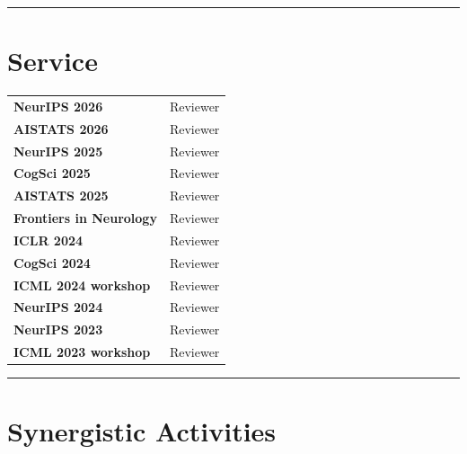 \documentclass[10pt,letterpaper]{article}
\begin{document}
\medskip\hrule\medskip

\section{Service}
\vspace{1mm}
\begin{tabular}{@{}l l@{}}
\textbf{NeurIPS 2026} & Reviewer\\
\textbf{AISTATS 2026} & Reviewer\\
\textbf{NeurIPS 2025} & Reviewer\\
\textbf{CogSci 2025} & Reviewer\\
\textbf{AISTATS 2025} & Reviewer\\
\textbf{Frontiers in Neurology} & Reviewer\\
\textbf{ICLR 2024} & Reviewer\\
\textbf{CogSci 2024} & Reviewer\\
\textbf{ICML 2024 workshop} & Reviewer \\
\textbf{NeurIPS 2024} & Reviewer \\
\textbf{NeurIPS 2023} & Reviewer \\
\textbf{ICML 2023 workshop} & Reviewer \\
\end{tabular}

\medskip\hrule\medskip

\section{Synergistic Activities}
\end{document}
